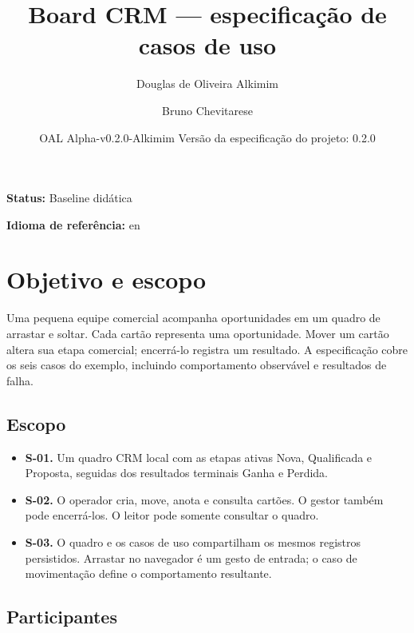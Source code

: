 \documentclass[10pt,a4paper]{article}
\begin{document}
\title{Board CRM --- especificação de casos de uso}

\author{Douglas de Oliveira Alkimim \and Bruno Chevitarese}

\date{OAL Alpha-v0.2.0-Alkimim \quad Versão da especificação do projeto: 0.2.0}

\maketitle

\textbf{Status:} Baseline didática

\textbf{Idioma de referência:} en

\section{Objetivo e escopo}

Uma pequena equipe comercial acompanha oportunidades em um quadro de arrastar e soltar. Cada cartão representa uma oportunidade. Mover um cartão altera sua etapa comercial; encerrá-lo registra um resultado. A especificação cobre os seis casos do exemplo, incluindo comportamento observável e resultados de falha.

\subsection{Escopo}

\begin{itemize}

\item \textbf{S-01.} Um quadro CRM local com as etapas ativas Nova, Qualificada e Proposta, seguidas dos resultados terminais Ganha e Perdida.

\item \textbf{S-02.} O operador cria, move, anota e consulta cartões. O gestor também pode encerrá-los. O leitor pode somente consultar o quadro.

\item \textbf{S-03.} O quadro e os casos de uso compartilham os mesmos registros persistidos. Arrastar no navegador é um gesto de entrada; o caso de movimentação define o comportamento resultante.

\end{itemize}

\subsection{Participantes}
\end{document}
